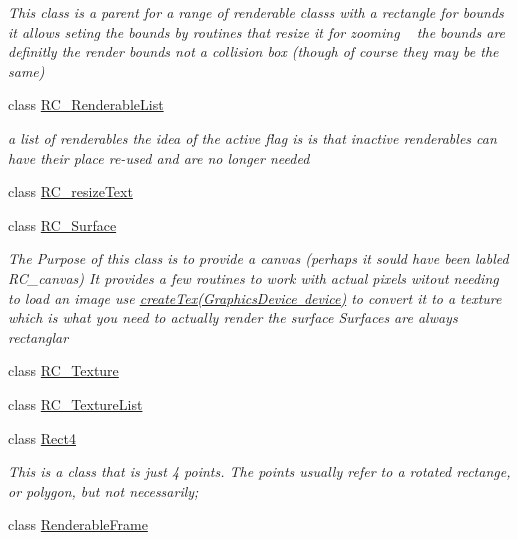 \begin{DoxyCompactItemize}
\begin{DoxyCompactList}\small\item\em This class is a parent for a range of renderable class\textquotesingle{}s with a rectangle for bounds it allows seting the bounds by routines that resize it for zooming ~\newline
the bounds are definitly the render bounds not a collision box (though of course they may be the same) \end{DoxyCompactList}\item 
class \mbox{\hyperlink{class_r_c___framework_1_1_r_c___renderable_list}{R\+C\+\_\+\+Renderable\+List}}
\begin{DoxyCompactList}\small\item\em a list of renderables the idea of the active flag is is that inactive renderables can have their place re-\/used and are no longer needed \end{DoxyCompactList}\item 
class \mbox{\hyperlink{class_r_c___framework_1_1_r_c__resize_text}{R\+C\+\_\+resize\+Text}}
\item 
class \mbox{\hyperlink{class_r_c___framework_1_1_r_c___surface}{R\+C\+\_\+\+Surface}}
\begin{DoxyCompactList}\small\item\em The Purpose of this class is to provide a canvas (perhaps it sould have been labled R\+C\+\_\+canvas) It provides a few routines to work with actual pixels witout needing to load an image use \mbox{\hyperlink{class_r_c___framework_1_1_r_c___surface_a88a1b5fd5ab87f2f3cdb9bf0bc825ffc}{create\+Tex(\+Graphics\+Device device)}} to convert it to a texture which is what you need to actually render the surface Surfaces are always rectanglar \end{DoxyCompactList}\item 
class \mbox{\hyperlink{class_r_c___framework_1_1_r_c___texture}{R\+C\+\_\+\+Texture}}
\item 
class \mbox{\hyperlink{class_r_c___framework_1_1_r_c___texture_list}{R\+C\+\_\+\+Texture\+List}}
\item 
class \mbox{\hyperlink{class_r_c___framework_1_1_rect4}{Rect4}}
\begin{DoxyCompactList}\small\item\em This is a class that is just 4 points. The points usually refer to a rotated rectange, or polygon, but not necessarily; \end{DoxyCompactList}\item 
class \mbox{\hyperlink{class_r_c___framework_1_1_renderable_frame}{Renderable\+Frame}}

\end{DoxyCompactItemize}
